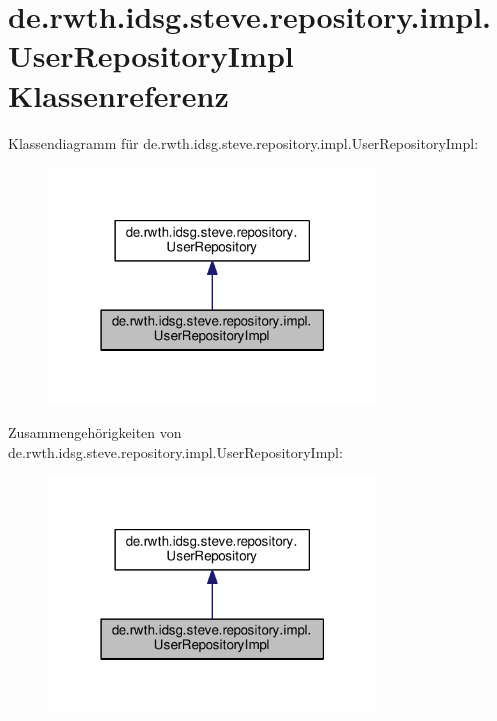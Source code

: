 \hypertarget{classde_1_1rwth_1_1idsg_1_1steve_1_1repository_1_1impl_1_1_user_repository_impl}{\section{de.\+rwth.\+idsg.\+steve.\+repository.\+impl.\+User\+Repository\+Impl Klassenreferenz}
\label{classde_1_1rwth_1_1idsg_1_1steve_1_1repository_1_1impl_1_1_user_repository_impl}
}


Klassendiagramm für de.\+rwth.\+idsg.\+steve.\+repository.\+impl.\+User\+Repository\+Impl\+:\nopagebreak
\begin{figure}[H]
\begin{center}
\leavevmode
\includegraphics[width=247pt]{classde_1_1rwth_1_1idsg_1_1steve_1_1repository_1_1impl_1_1_user_repository_impl__inherit__graph}
\end{center}
\end{figure}


Zusammengehörigkeiten von de.\+rwth.\+idsg.\+steve.\+repository.\+impl.\+User\+Repository\+Impl\+:\nopagebreak
\begin{figure}[H]
\begin{center}
\leavevmode
\includegraphics[width=247pt]{classde_1_1rwth_1_1idsg_1_1steve_1_1repository_1_1impl_1_1_user_repository_impl__coll__graph}
\end{center}
\end{figure}
